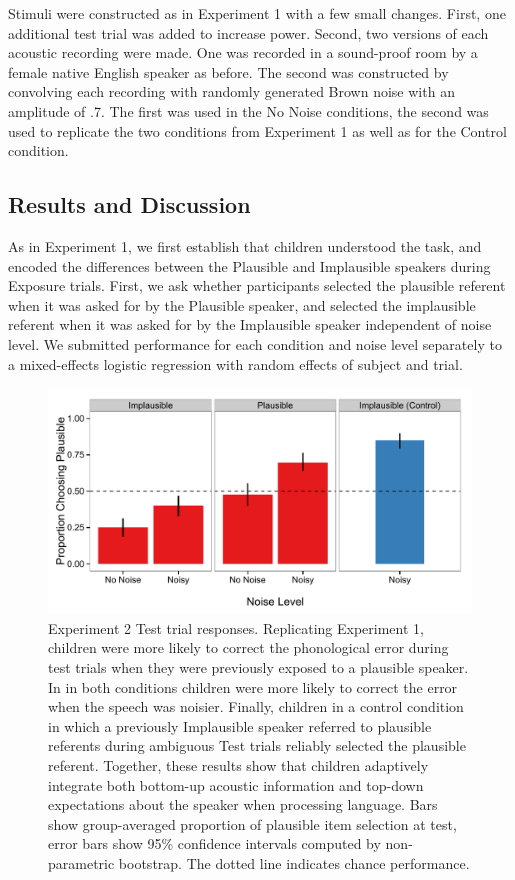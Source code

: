 \documentclass[man,floatsintext]{apa6}
\begin{document}
Stimuli were constructed as in Experiment 1 with a few small changes. First, one additional test trial was added to increase power. Second, two versions of each acoustic recording were made. One was recorded in a sound-proof room by a female native English speaker as before. The second was constructed by convolving each recording with randomly generated Brown noise with an amplitude of .7. The first was used in the No Noise conditions, the second was used to replicate the two conditions from Experiment 1 as well as for the Control condition.

\subsection{Results and Discussion}

As in Experiment 1, we first establish that children understood the task, and encoded the differences between the Plausible and Implausible speakers during Exposure trials. First, we ask whether participants selected the plausible referent when it was asked for by the Plausible speaker, and selected the implausible referent when it was asked for by the Implausible speaker independent of noise level. We submitted performance for each condition and noise level separately to a mixed-effects logistic regression with random effects of subject and trial. 

\begin{figure}[tb]
     \begin{center}
     \includegraphics[width=\textwidth]{figures/exp2_results.pdf}
    \end{center}
    \caption{Experiment 2 Test trial responses. Replicating Experiment 1, children were more likely to correct the phonological error during test trials when they were previously exposed to a plausible speaker. In in both conditions children were more likely to correct the error when the speech was noisier. Finally, children in a control condition in which a previously Implausible speaker referred to plausible referents during ambiguous Test trials reliably selected the plausible referent. Together, these results show that children adaptively integrate both bottom-up acoustic information and top-down expectations about the speaker when processing language. Bars show group-averaged proportion of plausible item selection at test, error bars show 95\% confidence intervals computed by non-parametric bootstrap. The dotted line indicates chance performance.}%
   \label{fig:exp2_results}
\end{figure}
\end{document}
